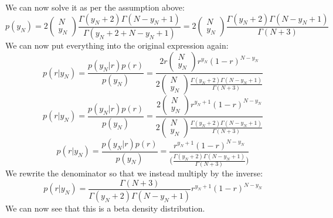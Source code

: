 We can now solve it as per the assumption above:
$$
p(y_N) = 2\begin{pmatrix} N\\ y_N \end{pmatrix} \frac{\Gamma(y_N+2)\Gamma(N-y_N+1)}{\Gamma(y_N+2 + N-y_N+1)} = 2\begin{pmatrix} N\\ y_N \end{pmatrix} \frac{\Gamma(y_N+2)\Gamma(N-y_N+1)}{\Gamma(N+3)}
$$
We can now put everything into the original expression again:
$$
p(r|y_N) = \frac{p(y_N|r)p(r)}{p(y_N)} = \frac{2r\begin{pmatrix} N\\ y_N \end{pmatrix} r^{y_N} (1-r)^{N-y_N}}{2\begin{pmatrix} N\\ y_N \end{pmatrix} \frac{\Gamma(y_N+2)\Gamma(N-y_N+1)}{\Gamma(N+3)}}
$$
$$
p(r|y_N) = \frac{p(y_N|r)p(r)}{p(y_N)} = \frac{2\begin{pmatrix} N\\ y_N \end{pmatrix} r^{y_N+1} (1-r)^{N-y_N}}{2\begin{pmatrix} N\\ y_N \end{pmatrix} \frac{\Gamma(y_N+2)\Gamma(N-y_N+1)}{\Gamma(N+3)}}
$$
$$
p(r|y_N) = \frac{p(y_N|r)p(r)}{p(y_N)} = \frac{r^{y_N+1} (1-r)^{N-y_N}}{\Big(\frac{\Gamma(y_N+2)\Gamma(N-y_N+1)}{\Gamma(N+3)}\Big)}
$$
We rewrite the denominator so that we instead multiply by the inverse:
$$
p(r|y_N) = \frac{\Gamma(N+3)}{\Gamma(y_N+2)\Gamma(N-y_N+1)}r^{y_N+1} (1-r)^{N-y_N}
$$
We can now see that this is a beta density distribution.